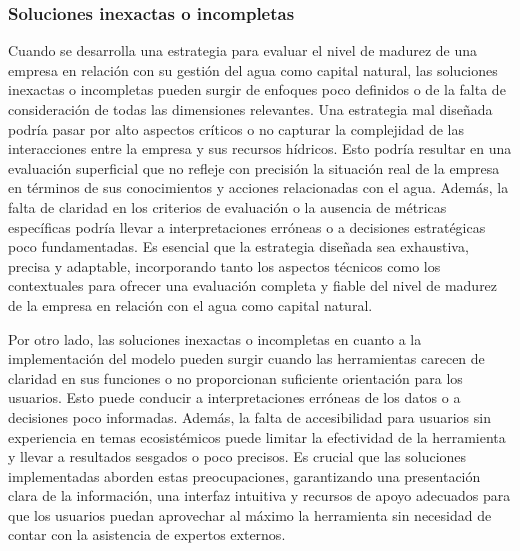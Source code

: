 \subsubsection{Soluciones inexactas o incompletas}
Cuando se desarrolla una estrategia para evaluar el nivel de madurez de una empresa en relación con su gestión del agua como capital natural, las soluciones inexactas o incompletas pueden surgir de enfoques poco definidos o de la falta de consideración de todas las dimensiones relevantes. Una estrategia mal diseñada podría pasar por alto aspectos críticos o no capturar la complejidad de las interacciones entre la empresa y sus recursos hídricos. Esto podría resultar en una evaluación superficial que no refleje con precisión la situación real de la empresa en términos de sus conocimientos y acciones relacionadas con el agua. Además, la falta de claridad en los criterios de evaluación o la ausencia de métricas específicas podría llevar a interpretaciones erróneas o a decisiones estratégicas poco fundamentadas. Es esencial que la estrategia diseñada sea exhaustiva, precisa y adaptable, incorporando tanto los aspectos técnicos como los contextuales para ofrecer una evaluación completa y fiable del nivel de madurez de la empresa en relación con el agua como capital natural. 

\hfill

Por otro lado, las soluciones inexactas o incompletas en cuanto a la implementación del modelo pueden surgir cuando las herramientas carecen de claridad en sus funciones o no proporcionan suficiente orientación para los usuarios. Esto puede conducir a interpretaciones erróneas de los datos o a decisiones poco informadas. Además, la falta de accesibilidad para usuarios sin experiencia en temas ecosistémicos puede limitar la efectividad de la herramienta y llevar a resultados sesgados o poco precisos. Es crucial que las soluciones implementadas aborden estas preocupaciones, garantizando una presentación clara de la información, una interfaz intuitiva y recursos de apoyo adecuados para que los usuarios puedan aprovechar al máximo la herramienta sin necesidad de contar con la asistencia de expertos externos.


